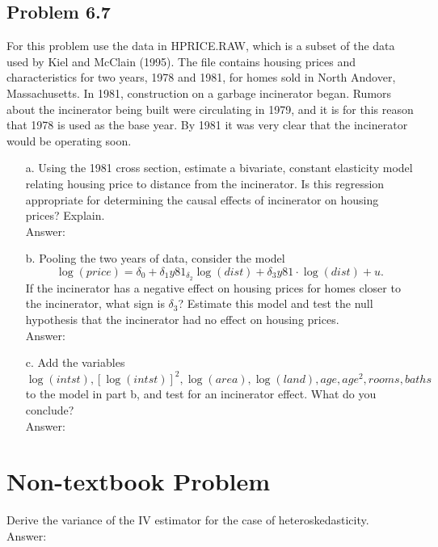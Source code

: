 \documentclass[10pt]{article}
\begin{document}
\subsection*{Problem 6.7}
For this problem use the data in HPRICE.RAW, which is a subset of the data used by Kiel and McClain (1995). The file contains housing prices and characteristics for two years, 1978 and 1981, for homes sold in North Andover, Massachusetts. In 1981, construction on a garbage incinerator began. Rumors about the incinerator being built were circulating in 1979, and it is for this reason that 1978 is used as the base year. By 1981 it was very clear that the incinerator would be operating soon.
\begin{enumerate}
\item[a.] Using the 1981 cross section, estimate a bivariate, constant elasticity model relating housing price to distance from the incinerator. Is this regression appropriate for determining the causal effects of incinerator on housing prices? Explain.
\\ Answer:\\


\item[b.] Pooling the two years of data, consider the model
\[\log(price)=\delta_0+\delta_1y81_\delta_2\log(dist)+\delta_3y81\cdot \log(dist)+u.\]
If the incinerator has a negative effect on housing prices for homes closer to the incinerator, what sign is $\delta_3$? Estimate this model and test the null hypothesis that the incinerator had no effect on housing prices. 
\\ Answer:\\


\item[c.] Add the variables $\log(intst),[\log(intst)]^2,\log(area),\log(land),age,age^2,rooms,baths$ to the model in part b, and test for an incinerator effect. What do you conclude?
\\ Answer:\\

\end{enumerate}

\section*{Non-textbook Problem}
Derive the variance of the IV estimator for the case of heteroskedasticity.
\\ Answer:\\
\end{document}

